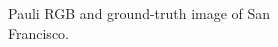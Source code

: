 \documentclass[10pt]{beamer}
\begin{document}
\begin{frame}
\begin{columns}
\begin{column}{0.5\textwidth}
\begin{figure}
\centering
{}
\caption{ Pauli RGB and ground-truth image of San Francisco.}
\label{fig:two}
\end{figure}
\end{column}
\begin{column}{0.5\textwidth}
\begin{figure}
\centering

\end{figure}
\end{column}
\end{columns}
\end{frame}
\end{document}
